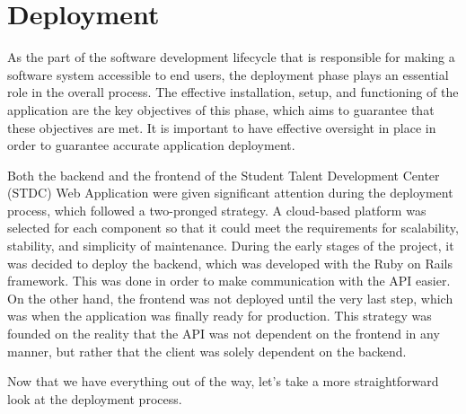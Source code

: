 \section{Deployment}
\begin{justify}
    As the part of the software development lifecycle that is responsible for making a software system accessible to end users, the deployment phase plays an essential role in the overall process. The effective installation, setup, and functioning of the application are the key objectives of this phase, which aims to guarantee that these objectives are met. It is important to have effective oversight in place in order to guarantee accurate application deployment.

    \vspace{0.25cm}
    \newendline Both the backend and the frontend of the Student Talent Development Center (STDC) Web Application were given significant attention during the deployment process, which followed a two-pronged strategy. A cloud-based platform was selected for each component so that it could meet the requirements for scalability, stability, and simplicity of maintenance. During the early stages of the project, it was decided to deploy the backend, which was developed with the Ruby on Rails framework. This was done in order to make communication with the API easier. On the other hand, the frontend was not deployed until the very last step, which was when the application was finally ready for production. This strategy was founded on the reality that the API was not dependent on the frontend in any manner, but rather that the client was solely dependent on the backend.
    
    \vspace{0.25cm}
    \newendline Now that we have everything out of the way, let's take a more straightforward look at the deployment process.\\
\end{justify}


